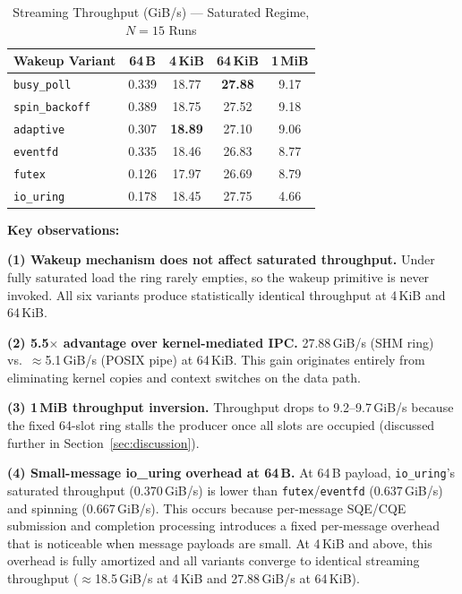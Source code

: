 \documentclass[10pt,conference]{IEEEtran}
\begin{document}
\begin{table}[H]
  \centering
  \caption{Streaming Throughput (GiB/s) --- Saturated Regime, $N=15$ Runs}
  \label{tab:throughput}
  \small
  \begin{tabular}{@{}L{2.6cm}cccc@{}}
    \toprule
    \textbf{Wakeup Variant} & \textbf{64\,B} & \textbf{4\,KiB} &
        \textbf{64\,KiB} & \textbf{1\,MiB} \\
    \midrule
    \texttt{busy\_poll}    & 0.339 & 18.77 & \textbf{27.88} & 9.17 \\
    \texttt{spin\_backoff} & 0.389 & 18.75 & 27.52 & 9.18 \\
    \texttt{adaptive}      & 0.307 & \textbf{18.89} & 27.10 & 9.06 \\
    \texttt{eventfd}       & 0.335 & 18.46 & 26.83 & 8.77 \\
    \texttt{futex}         & 0.126 & 17.97 & 26.69 & 8.79 \\
    \texttt{io\_uring}     & 0.178 & 18.45 & 27.75 & 4.66 \\
    \bottomrule
  \end{tabular}
\end{table}



\textbf{Key observations:}

\textbf{(1) Wakeup mechanism does not affect saturated throughput.}
Under fully saturated load the ring rarely empties, so the wakeup primitive is
never invoked.  All six variants produce statistically identical throughput at
4\,KiB and 64\,KiB.

\textbf{(2) 5.5$\times$ advantage over kernel-mediated IPC.}
27.88\,GiB/s (SHM ring) vs.\ $\approx$5.1\,GiB/s (POSIX pipe) at 64\,KiB.
This gain originates entirely from eliminating kernel copies and context
switches on the data path.

\textbf{(3) 1\,MiB throughput inversion.}
Throughput drops to 9.2--9.7\,GiB/s because the fixed 64-slot ring stalls the
producer once all slots are occupied (discussed further in
Section~\ref{sec:discussion}).

\textbf{(4) Small-message io\_uring overhead at 64\,B.}
At 64\,B payload, \texttt{io\_uring}'s saturated throughput (0.370\,GiB/s) is lower
than \texttt{futex}/\texttt{eventfd} (0.637\,GiB/s) and spinning (0.667\,GiB/s).
This occurs because per-message SQE/CQE submission and completion processing introduces
a fixed per-message overhead that is noticeable when message payloads are small. At 4\,KiB
and above, this overhead is fully amortized and all variants converge to identical
streaming throughput ($\approx$18.5\,GiB/s at 4\,KiB and 27.88\,GiB/s at 64\,KiB).
\end{document}
